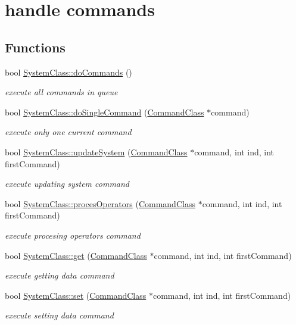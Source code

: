 \hypertarget{group__commands}{}\section{handle commands}
\label{group__commands}
\subsection*{Functions}
\begin{DoxyCompactItemize}
\item 
bool \hyperlink{group__commands_ga8007871209331455c3f7aa5b2991b061}{System\+Class\+::do\+Commands} ()
\begin{DoxyCompactList}\small\item\em execute all commands in queue \end{DoxyCompactList}\item 
bool \hyperlink{group__commands_gaafe0a61b5a2144016008ca529067862a}{System\+Class\+::do\+Single\+Command} (\hyperlink{class_command_class}{Command\+Class} $\ast$command)
\begin{DoxyCompactList}\small\item\em execute only one current command \end{DoxyCompactList}\item 
bool \hyperlink{group__commands_ga19c15f7c6bc2743a04fcac998ab17677}{System\+Class\+::update\+System} (\hyperlink{class_command_class}{Command\+Class} $\ast$command, int ind, int first\+Command)
\begin{DoxyCompactList}\small\item\em execute updating system command \end{DoxyCompactList}\item 
bool \hyperlink{group__commands_gadc6bf9bc3ae14f2ee2f661818a500220}{System\+Class\+::proces\+Operators} (\hyperlink{class_command_class}{Command\+Class} $\ast$command, int ind, int first\+Command)
\begin{DoxyCompactList}\small\item\em execute procesing operators command \end{DoxyCompactList}\item 
bool \hyperlink{group__commands_ga5ff4f256861285812190f780dcddff01}{System\+Class\+::get} (\hyperlink{class_command_class}{Command\+Class} $\ast$command, int ind, int first\+Command)
\begin{DoxyCompactList}\small\item\em execute getting data command \end{DoxyCompactList}\item 
bool \hyperlink{group__commands_ga2c069c91c63a13da2944a468837d2aa8}{System\+Class\+::set} (\hyperlink{class_command_class}{Command\+Class} $\ast$command, int ind, int first\+Command)
\begin{DoxyCompactList}\small\item\em execute setting data command \end{DoxyCompactList}\end{DoxyCompactItemize}


